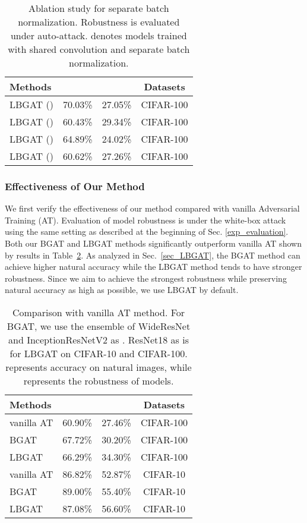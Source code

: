 \documentclass[10pt,twocolumn,letterpaper]{article}
\begin{document}
\begin{table}
	\centering
	\caption{Ablation study for separate batch normalization. Robustness is evaluated under auto-attack. \dag denotes models trained with shared convolution and separate batch normalization.} 
	\resizebox{0.90\linewidth}{!}
	{
		\begin{tabular}{l|c|c|c}
			\textbf{Methods} & & &\textbf{Datasets}\\
			\hline
			\hline
			LBGAT ()        &70.03\%  &27.05\% &CIFAR-100 \\
			LBGAT ()        &60.43\%  &29.34\% &CIFAR-100 \\
			\hline
			LBGAT () \dag        &64.89\%  &24.02\% &CIFAR-100 \\
			LBGAT () \dag        &60.62\%  &27.26\% &CIFAR-100 \\
			\hline
		\end{tabular}
		\label{tab:ablation_separate_bn}
	}
\end{table}

\subsubsection{Effectiveness of Our Method}
\label{exp_effectiveness}
We first verify the effectiveness of our method compared with vanilla Adversarial Training (AT). Evaluation of model robustness is under the white-box attack using the same setting as described at the beginning of Sec. \ref{exp_evaluation}. Both our BGAT and LBGAT methods significantly outperform vanilla AT shown by results in Table~\ref{tab:effectiveness}. As analyzed in Sec.~\ref{sec_LBGAT}, the BGAT method can achieve higher natural accuracy while the LBGAT method tends to have stronger robustness. Since we aim to achieve the strongest robustness while preserving natural accuracy as high as possible, we use LBGAT by default.   

\begin{table}[t!]
	\centering
	\caption{Comparison with vanilla AT method. For BGAT, we use the ensemble of WideResNet and InceptionResNetV2 as . ResNet18 as  is for LBGAT on CIFAR-10 and CIFAR-100.  represents accuracy on natural images, while  represents the robustness of models.} 
	\resizebox{0.80\linewidth}{!}
	{
	\begin{tabular}{l|c|c|c}
		\textbf{Methods} & & &\textbf{Datasets} \\
		\hline
		\hline
		vanilla AT  &60.90\% &27.46\%  &CIFAR-100 \\
		BGAT        &67.72\% &30.20\%  &CIFAR-100 \\
		LBGAT       &66.29\% &34.30\%  &CIFAR-100 \\
		\hline
		vanilla AT  &86.82\% &52.87\%  &CIFAR-10 \\
		BGAT        &89.00\% &55.40\%  &CIFAR-10 \\
		LBGAT       &87.08\% &56.60\%  &CIFAR-10 \\
		\hline
	\end{tabular}
    }
	\label{tab:effectiveness}
\end{table}
\end{document}
